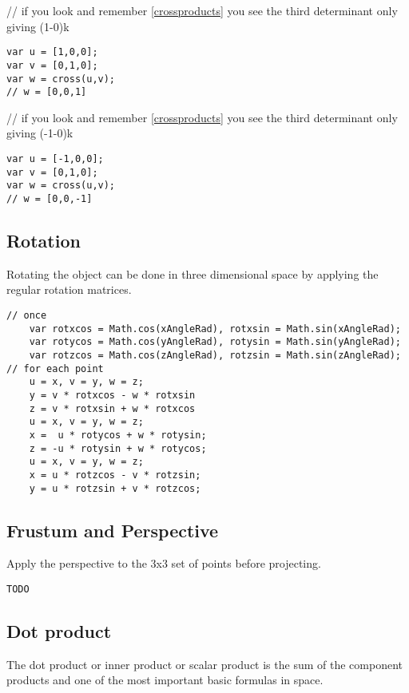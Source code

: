 \documentclass[a4paper]{article}
\begin{document}
\begin{PropositionOpt4}
// if you look and remember \ref{crossproducts} you see the third determinant only giving (1-0)k
\begin{lstlisting}
var u = [1,0,0];
var v = [0,1,0]; 
var w = cross(u,v);
// w = [0,0,1]
\end{lstlisting}
// if you look and remember \ref{crossproducts} you see the third determinant only giving (-1-0)k
\begin{lstlisting}
var u = [-1,0,0];
var v = [0,1,0];
var w = cross(u,v);
// w = [0,0,-1]
\end{lstlisting}

\subsection{Rotation}

Rotating the object can be done in three dimensional space by applying the regular rotation matrices. 

\begin{lstlisting}
// once
    var rotxcos = Math.cos(xAngleRad), rotxsin = Math.sin(xAngleRad);
    var rotycos = Math.cos(yAngleRad), rotysin = Math.sin(yAngleRad);
    var rotzcos = Math.cos(zAngleRad), rotzsin = Math.sin(zAngleRad);
// for each point
    u = x, v = y, w = z;
    y = v * rotxcos - w * rotxsin
    z = v * rotxsin + w * rotxcos
    u = x, v = y, w = z;
    x =  u * rotycos + w * rotysin;
    z = -u * rotysin + w * rotycos;
    u = x, v = y, w = z;
    x = u * rotzcos - v * rotzsin;
    y = u * rotzsin + v * rotzcos;
\end{lstlisting}

\subsection{Frustum and Perspective}

Apply the perspective to the 3x3 set of points before projecting.

\begin{lstlisting}
TODO
\end{lstlisting}


\subsection{Dot product}

The dot product or inner product or scalar product is the sum of the component products and one of the most important basic formulas in space.\\


\end{PropositionOpt4}
\end{document}
